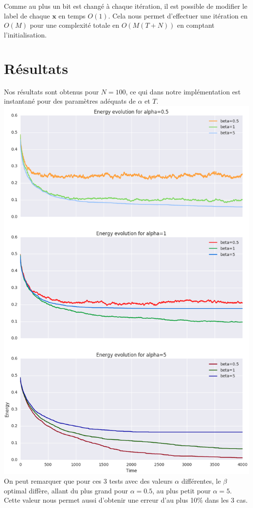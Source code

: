 \documentclass[twocolumn]{article}
\begin{document}
		Comme au plus un bit est changé à chaque itération, il est possible de modifier le label de chaque $\mathbf{x}$ en temps $O(1)$. Cela nous permet d'effectuer une itération en $O(M)$ pour une complexité totale en $O(M(T + N))$ en comptant l'initialisation.
		
	\section{Résultats}
		Nos résultats sont obtenus pour $N=100$, ce qui dans notre implémentation est instantané pour des paramètres adéquats de $\alpha$ et $T$.
		\includegraphics[width=\columnwidth]{../tobekept/ex1_1755923751722050074-r.png}
		On peut remarquer que pour ces 3 tests avec des valeurs $\alpha$ différentes, le $\beta$ optimal diffère, allant du plus grand pour $\alpha = 0.5$, au plus petit pour $\alpha = 5$.
		Cette valeur nous permet aussi d'obtenir une erreur d'au plus 10\% dans les 3 cas.
		
\end{document}
